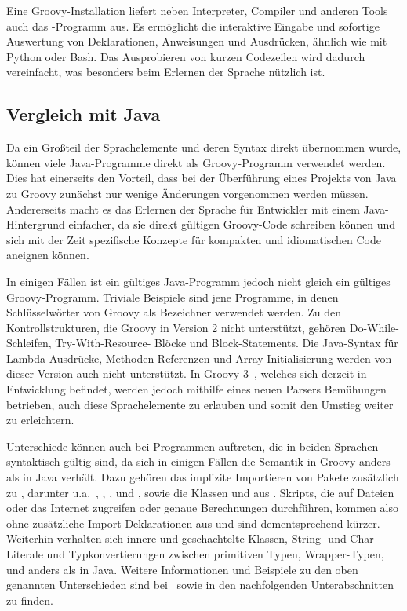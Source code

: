 \documentclass[a4paper]{article}
\begin{document}
Eine Groovy-Installation liefert neben Interpreter, Compiler und anderen Tools auch das -Programm aus.
Es ermöglicht die interaktive Eingabe und sofortige Auswertung von Deklarationen, Anweisungen und Ausdrücken, ähnlich wie mit Python oder Bash.
Das Ausprobieren von kurzen Codezeilen wird dadurch vereinfacht, was besonders beim Erlernen der Sprache nützlich ist.

\subsection{Vergleich mit Java}\label{subsec:vergleichMitJava}

Da ein Großteil der Sprachelemente und deren Syntax direkt übernommen wurde, können viele Java-Programme direkt als Groovy-Programm verwendet werden.
Dies hat einerseits den Vorteil, dass bei der Überführung eines Projekts von Java zu Groovy zunächst nur wenige Änderungen vorgenommen werden müssen.
Andererseits macht es das Erlernen der Sprache für Entwickler mit einem Java-Hintergrund einfacher, da sie direkt gültigen Groovy-Code schreiben können und sich mit der Zeit spezifische Konzepte für kompakten und idiomatischen Code aneignen können.

In einigen Fällen ist ein gültiges Java-Programm jedoch nicht gleich ein gültiges Groovy-Programm.
Triviale Beispiele sind jene Programme, in denen Schlüsselwörter von Groovy als Bezeichner verwendet werden.
Zu den Kontrollstrukturen, die Groovy in Version 2 nicht unterstützt, gehören Do-While-Schleifen, Try-With-Resource- Blöcke und Block-Statements.
Die Java-Syntax für Lambda-Ausdrücke, Methoden-Referenzen und Array-Initialisierung werden von dieser Version auch nicht unterstützt.
In Groovy 3~\cite{groovy-lang:release3}, welches sich derzeit in Entwicklung befindet, werden jedoch mithilfe eines neuen Parsers Bemühungen betrieben, auch diese Sprachelemente zu erlauben und somit den Umstieg weiter zu erleichtern.

Unterschiede können auch bei Programmen auftreten, die in beiden Sprachen syntaktisch gültig sind, da sich in einigen Fällen die Semantik in Groovy anders als in Java verhält.
Dazu gehören das implizite Importieren von Pakete zusätzlich zu , darunter u.a.~, , ,  und , sowie die Klassen  und  aus .
Skripts, die auf Dateien oder das Internet zugreifen oder genaue Berechnungen durchführen, kommen also ohne zusätzliche Import-Deklarationen aus und sind dementsprechend kürzer.
Weiterhin verhalten sich innere und geschachtelte Klassen, String- und Char-Literale und Typkonvertierungen zwischen primitiven Typen, Wrapper-Typen,  und  anders als in Java.
Weitere Informationen und Beispiele zu den oben genannten Unterschieden sind bei~\cite[Abs~3.2.]{groovy-lang:documentation} sowie in den nachfolgenden Unterabschnitten zu finden.
\end{document}
